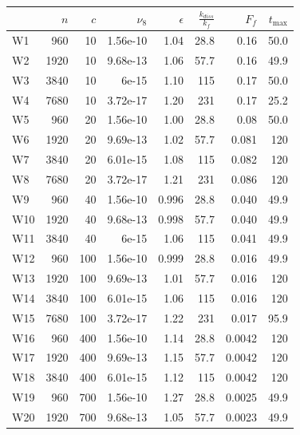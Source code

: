 \documentclass{jfm}
\begin{document}
\begin{table}
\begin{center}


\begin{tabular}{lrrrrrrr}
\toprule
{} &   $n$ &  $c$ &  $\nu_8$ &  $\epsilon$ &  $\frac{k_{diss}}{k_f}$ &   $F_f$ &  $t_{\max}$ \\
\midrule
W1  &   960 &   10 & 1.56e-10 &        1.04 &                    28.8 &   0.16 &          50.0 \\
W2  &  1920 &   10 & 9.68e-13 &        1.06 &                    57.7 &   0.16 &        49.9 \\
W3  &  3840 &   10 &    6e-15 &         1.10 &                     115 &   0.17 &          50.0 \\
W4  &  7680 &   10 & 3.72e-17 &         1.20 &                     231 &   0.17 &        25.2 \\
W5  &   960 &   20 & 1.56e-10 &           1.00 &                    28.8 &  0.08 &          50.0 \\
W6  &  1920 &   20 & 9.69e-13 &        1.02 &                    57.7 &  0.081 &         120 \\
W7  &  3840 &   20 & 6.01e-15 &        1.08 &                     115 &  0.082 &         120 \\
W8  &  7680 &   20 & 3.72e-17 &        1.21 &                     231 &  0.086 &         120 \\
W9  &   960 &   40 & 1.56e-10 &       0.996 &                    28.8 &  0.040 &        49.9 \\
W10 &  1920 &   40 & 9.68e-13 &       0.998 &                    57.7 &  0.040 &        49.9 \\
W11 &  3840 &   40 &    6e-15 &        1.06 &                     115 &  0.041 &        49.9 \\
W12 &   960 &  100 & 1.56e-10 &       0.999 &                    28.8 &  0.016 &        49.9 \\
W13 &  1920 &  100 & 9.69e-13 &        1.01 &                    57.7 &  0.016 &         120 \\
W14 &  3840 &  100 & 6.01e-15 &        1.06 &                     115 &  0.016 &         120 \\
W15 &  7680 &  100 & 3.72e-17 &        1.22 &                     231 &  0.017 &        95.9 \\
W16 &   960 &  400 & 1.56e-10 &        1.14 &                    28.8 &  0.0042 &         120 \\
W17 &  1920 &  400 & 9.69e-13 &        1.15 &                    57.7 & 0.0042 &         120 \\
W18 &  3840 &  400 & 6.01e-15 &        1.12 &                     115 & 0.0042 &         120 \\
W19 &   960 &  700 & 1.56e-10 &        1.27 &                    28.8 & 0.0025 &        49.9 \\
W20 &  1920 &  700 & 9.68e-13 &        1.05 &                    57.7 & 0.0023 &        49.9 \\
\bottomrule
\end{tabular}



\end{center}
\end{table}
\end{document}
